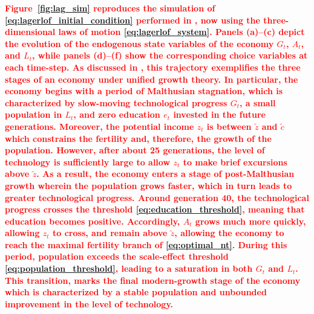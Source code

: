 \documentclass[a4paper,fleqn]{cas-sc}
\newcommand{\samd}[1]{\textcolor{red}{\textbf{#1}}}
\begin{document}
\samd{Figure~\ref{fig:lag_sim} reproduces the simulation of \eqref{eq:lagerlof_initial_condition} performed in \cite{Lagerlof2006}, now using the three-dimensional laws of motion \eqref{eq:lagerlof_system}. Panels (a)--(c) depict the evolution of the endogenous state variables of the economy $G_t$, $A_t$, and $L_t$, while panels (d)--(f) show the corresponding choice variables at each time-step. As discussed in \cite{Lagerlof2006}, this trajectory exemplifies the three stages of an economy under unified growth theory. In particular, the economy begins with a period of Malthusian stagnation, which is characterized by slow-moving technological progress $G_t$, a small population in $L_t$, and zero education $e_t$ invested in the future generations. Moreover, the potential income $z_t$ is between $\tilde z$ and $\tilde c$ which constrains the fertility and, therefore, the growth of the population. However, after about 25 generations, the level of technology is sufficiently large to allow $z_t$ to make brief excursions above $\tilde z$. As a result, the economy enters a stage of post-Malthusian growth wherein the population grows faster, which in turn leads to greater technological progress. Around generation 40, the technological progress crosses the threshold \eqref{eq:education_threshold}, meaning that education becomes positive. Accordingly, $A_t$ grows much more quickly, allowing $z_t$ to cross, and remain above $\tilde z$, allowing the economy to reach the maximal fertility branch of \eqref{eq:optimal_nt}. During this period, population exceeds the scale-effect threshold \eqref{eq:population_threshold}, leading to a saturation in both $G_t$ and $L_t$. This transition, marks the final modern-growth stage of the economy which is characterized by a stable population and unbounded improvement in the level of technology.   }
\end{document}
